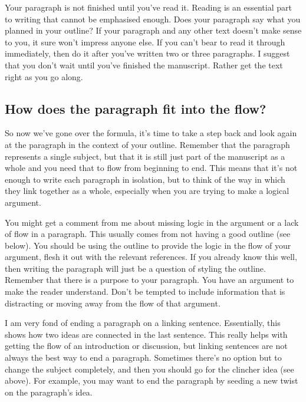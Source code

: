 \documentclass[
]{krantz}
\begin{document}
Your paragraph is not finished until you've read it. Reading is an essential part to writing that cannot be emphasised enough. Does your paragraph say what you planned in your outline? If your paragraph and any other text doesn't make sense to you, it sure won't impress anyone else. If you can't bear to read it through immediately, then do it after you've written two or three paragraphs. I suggest that you don't wait until you've finished the manuscript. Rather get the text right as you go along.

\hypertarget{how-does-the-paragraph-fit-into-the-flow}{%
\subsection{How does the paragraph fit into the flow?}\label{how-does-the-paragraph-fit-into-the-flow}}

So now we've gone over the formula, it's time to take a step back and look again at the paragraph in the context of your outline. Remember that the paragraph represents a single subject, but that it is still just part of the manuscript as a whole and you need that to flow from beginning to end. This means that it's not enough to write each paragraph in isolation, but to think of the way in which they link together as a whole, especially when you are trying to make a logical argument.

You might get a comment from me about missing logic in the argument or a lack of flow in a paragraph. This usually comes from not having a good outline (see below). You should be using the outline to provide the logic in the flow of your argument, flesh it out with the relevant references. If you already know this well, then writing the paragraph will just be a question of styling the outline. Remember that there is a purpose to your paragraph. You have an argument to make the reader understand. Don't be tempted to include information that is distracting or moving away from the flow of that argument.

I am very fond of ending a paragraph on a linking sentence. Essentially, this shows how two ideas are connected in the last sentence. This really helps with getting the flow of an introduction or discussion, but linking sentences are not always the best way to end a paragraph. Sometimes there's no option but to change the subject completely, and then you should go for the clincher idea (see above). For example, you may want to end the paragraph by seeding a new twist on the paragraph's idea.
\end{document}
